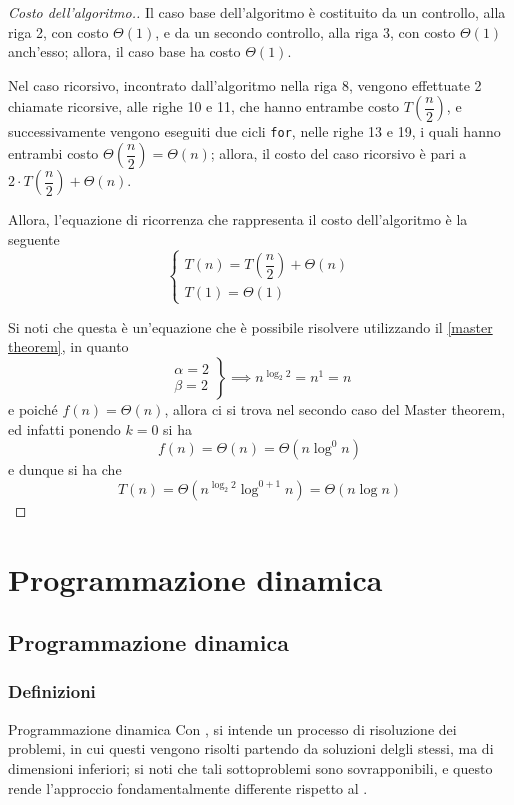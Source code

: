 \documentclass[a4paper, 12pt]{report}
\begin{document}
    \begin{proof}[Costo dell'algoritmo.]
        Il caso base dell'algoritmo è costituito da un controllo, alla riga 2, con costo $\Theta(1)$, e da un secondo controllo, alla riga 3, con costo $\Theta(1)$ anch'esso; allora, il caso base ha costo $\Theta(1)$.

        Nel caso ricorsivo, incontrato dall'algoritmo nella riga 8, vengono effettuate 2 chiamate ricorsive, alle righe 10 e 11, che hanno entrambe costo $T\left(\dfrac{n}{2}\right)$, e successivamente vengono eseguiti due cicli \texttt{for}, nelle righe 13 e 19, i quali hanno entrambi costo $\Theta\left(\dfrac{n}{2}\right) = \Theta(n)$; allora, il costo del caso ricorsivo è pari a $2 \cdot T\left(\dfrac{n}{2}\right) + \Theta(n)$.

        Allora, l'equazione di ricorrenza che rappresenta il costo dell'algoritmo è la seguente $$\left \{ \begin{array}{l} T(n) = T\left(\dfrac{n}{2}\right) + \Theta(n) \\ T(1) = \Theta(1) \end{array} \right .$$

        Si noti che questa è un'equazione che è possibile risolvere utilizzando il \cref{master theorem}, in quanto $$\left . \begin{array}{l} \alpha = 2 \\ \beta = 2 \end{array} \right \} \implies n ^ {\log_{2}{2}} = n^1 = n$$ e poiché $f(n) = \Theta(n)$, allora ci si trova nel secondo caso del Master theorem, ed infatti ponendo $k = 0$ si ha $$f(n) = \Theta(n) = \Theta(n \log^0 n)$$ e dunque si ha che $$T(n) = \Theta(n ^{\log_{2}{2}} \log ^ {0 + 1}n) = \Theta(n \log n)$$
    \end{proof}

    \chapter{Programmazione dinamica}

    \section{Programmazione dinamica}

    \subsection{Definizioni}

    \begin{frameddefn}{Programmazione dinamica}
        Con , si intende un processo di risoluzione dei problemi, in cui questi vengono risolti partendo da soluzioni delgli stessi, ma di dimensioni inferiori; si noti che tali sottoproblemi sono sovrapponibili, e questo rende l'approccio fondamentalmente differente rispetto al .
    \end{frameddefn}
\end{document}
